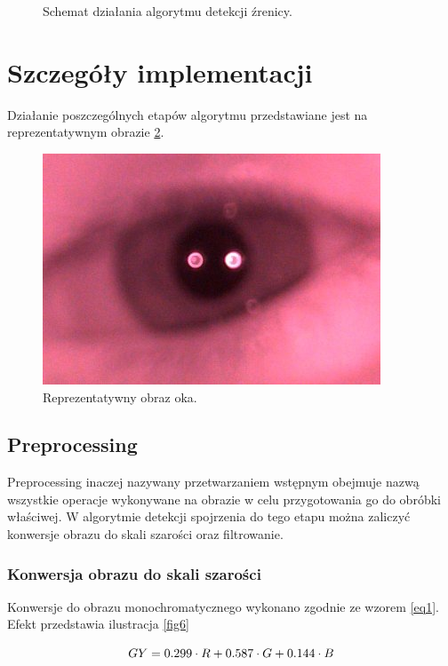\begin{figure}[!h]
\caption{Schemat działania algorytmu detekcji źrenicy. \label{fig4}}
\end{figure}

\newpage
\restoregeometry
\section{Szczegóły implementacji}
Działanie poszczególnych etapów algorytmu przedstawiane jest na reprezentatywnym obrazie \ref{fig5}.

\begin{figure}[!h]
\centering
\includegraphics[scale=0.3]{images/5.jpg}
\caption{Reprezentatywny obraz oka. \label{fig5}}
\end{figure}

\subsection{Preprocessing}
Preprocessing inaczej nazywany przetwarzaniem wstępnym obejmuje nazwą wszystkie operacje wykonywane na obrazie w celu przygotowania go do obróbki właściwej. W algorytmie detekcji spojrzenia do tego etapu można zaliczyć konwersje obrazu do skali szarości oraz filtrowanie.
\subsubsection{Konwersja obrazu do skali szarości}
Konwersje do obrazu monochromatycznego wykonano zgodnie ze wzorem \ref{eq1}. Efekt przedstawia ilustracja \ref{fig6}

\begin{equation}
  \centering
  GY = 0.299\cdot R + 0.587\cdot G + 0.144\cdot B \label{eq1}
\end{equation}
  

